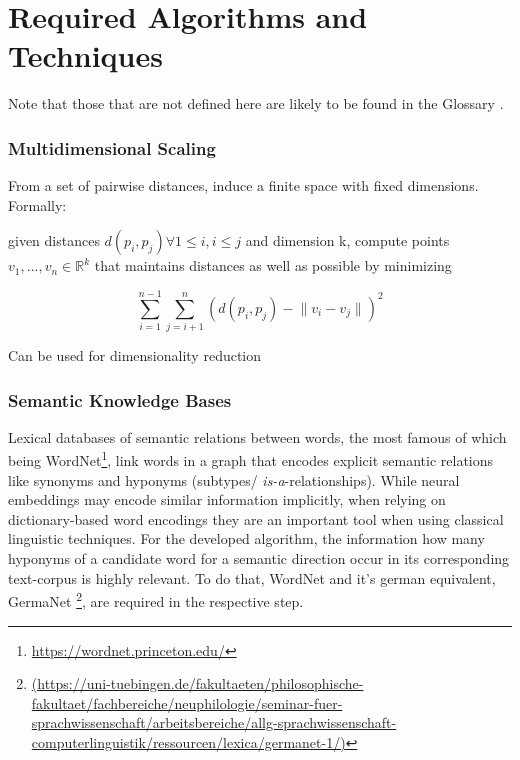 

\section{Required Algorithms and Techniques}

Note that those that are not defined here are likely to be found in the Glossary .

\subsubsection*{Multidimensional Scaling}

From a set of pairwise distances, induce a finite space with fixed dimensions. Formally:

given distances $d(p_i, p_j) \forall 1 \leq i, i \leq j$ and dimension k, compute points $v_1, ..., v_n \in \mathds{R}^k$ that maintains distances as well as possible by minimizing 

$$ \sum_{i=1}^{n-1}\sum_{j=i+1}^{n}(d(p_i, p_j) - \lVert v_i - v_j \rVert)^2 $$

Can be used for dimensionality reduction


\subsubsection*{Semantic Knowledge Bases}

Lexical databases of semantic relations between words, the most famous of which being WordNet\footnote{\url{https://wordnet.princeton.edu/}}, link words in a graph that encodes explicit semantic relations like synonyms and hyponyms (subtypes/ \emph{is-a}-relationships). While neural %
embeddings may encode similar information implicitly, when relying on dictionary-based word encodings they are an important tool when using classical linguistic techniques. For the developed algorithm, the information how many hyponyms of a candidate word for a semantic direction %
occur in its corresponding text-corpus is highly relevant. To do that, WordNet \cite{Miller1995} and it's german equivalent, GermaNet \cite{hamp-feldweg-1997-germanet,Henrich}\footnote{\url{(https://uni-tuebingen.de/fakultaeten/philosophische-fakultaet/fachbereiche/neuphilologie/seminar-fuer-sprachwissenschaft/arbeitsbereiche/allg-sprachwissenschaft-computerlinguistik/ressourcen/lexica/germanet-1/)}}, are required in the respective step.


